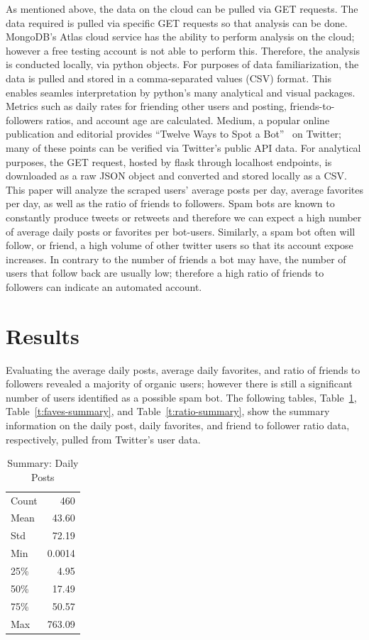 As mentioned above, the data on the cloud can be pulled via GET requests. The
data required is pulled via specific GET requests so that analysis can be done.
MongoDB's Atlas cloud service has the ability to perform analysis on the cloud;
however a free testing account is not able to perform this. Therefore, the
analysis is conducted locally, via python objects. For purposes of data
familiarization, the data is pulled and stored in a comma-separated values
(CSV) format. This enables seamles interpretation by python's many analytical
and visual packages. Metrics such as daily rates for friending other users and
posting, friends-to-followers ratios, and account age are calculated. Medium, a
popular online publication and editorial provides ``Twelve Ways to Spot a
Bot''~\cite{HowToSpotABot} on Twitter; many of these points can be verified via
Twitter's public API data. For analytical purposes, the GET request, hosted by
flask through localhost endpoints, is downloaded as a raw JSON object and
converted and stored locally as a CSV. This paper will analyze the scraped
users' average posts per day, average favorites per day, as well as the ratio
of friends to followers. Spam bots are known to constantly produce tweets or
retweets and therefore we can expect a high number of average daily posts or
favorites per bot-users. Similarly, a spam bot often will follow, or friend, a
high volume of other twitter users so that its account expose increases. In
contrary to the number of friends a bot may have, the number of users that
follow back are usually low; therefore a high ratio of friends to followers can
indicate an automated account.

\section{Results}

Evaluating the average daily posts, average daily favorites, and ratio of
friends to followers revealed a majority of organic users; however there is
still a significant number of users identified as a possible spam bot. The
following tables, Table~\ref{t:post-summary}, Table~\ref{t:faves-summary}, and
Table~\ref{t:ratio-summary},  show the summary information on the daily post,
daily favorites, and friend to follower ratio data, respectively, pulled from
Twitter's user data. 

\begin{table}[htb]
\centering
\caption{Summary: Daily Posts}
\label{t:post-summary}
\begin{tabular}{lr}
Count & 460 \\
Mean  & 43.60  \\
Std   & 72.19  \\
Min   & 0.0014 \\
25\%  & 4.95   \\
50\%  & 17.49  \\
75\%  & 50.57  \\
Max   & 763.09
\end{tabular}
\end{table}

